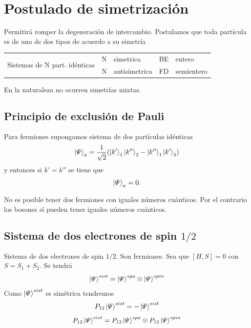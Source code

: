 \documentclass[10pt,oneside]{CBFT_book}
\begin{document}
\section{Postulado de simetrización}

Permitirá romper la degeneración de intercambio. 
Postulamos que toda partícula es de uno de dos tipos de acuerdo a su simetría 

\begin{center}
\begin{tabular}{|c|l|l|l|l|}
\multirow{2}{*}{Sistemas de N part. idénticas} & N & simetrica & BE & entero\\
& N & antisimetrica & FD & semientero
\end{tabular}
\end{center}

En la naturaleza no ocurren simetrías mixtas.

\subsection{Principio de exclusión de Pauli}

Para fermiones supongamos sistema de dos partículas idénticas 
\[
	\Ket{ \Psi }_a = \frac{1}{\sqrt{2}}( \Ket{k'}_1\Ket{k''}_2 - \Ket{k''}_1\Ket{k'}_2)
\]
y entonces si $k'=k''$ se tiene que 
\[
	\Ket{ \Psi }_a = 0.
\]

No es posible tener dos fermiones con iguales números cuánticos. Por el contrario los bosones sí pueden tener 
iguales números cuánticos.

\subsection{Sistema de dos electrones de spin $1/2$}

Sistema de dos electrones de spin $1/2$. Son fermiones. Sea que $[H,S]=0$  con $S = S_1 + S_2$. Se tendrá 
\[
	\Ket{\Psi}^{sist} = \Ket{\Psi}^{spa} \otimes \Ket{\Psi}^{spin}
\]
Como $\Ket{\Psi}^{sist}$ es simétrica tendremos 
\[
	P_{12} \Ket{\Psi}^{sist} = - \Ket{\Psi}^{sist} 
\]
\[
	P_{12} \Ket{\Psi}^{sist} = P_{12} \Ket{\Psi}^{spa} \otimes P_{12}\Ket{\Psi}^{spin} 
\]
\end{document}
